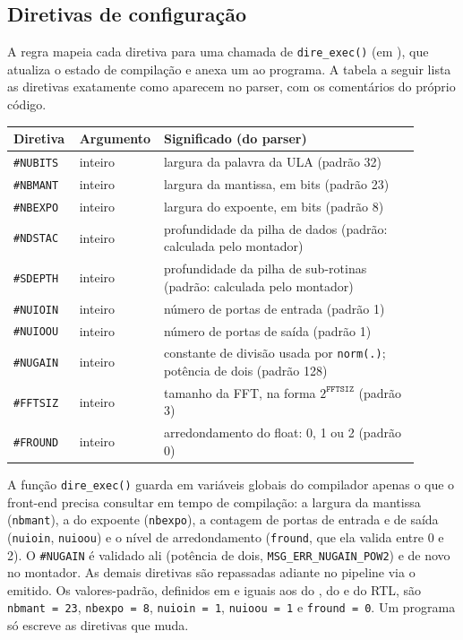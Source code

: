 \subsection{Diretivas de configuração}

A regra  mapeia cada diretiva para uma chamada de
\lstinline|dire_exec()| (em ), que atualiza o estado de
compilação e anexa um  ao programa. A tabela a seguir lista
as diretivas exatamente como aparecem no parser, com os comentários do próprio
código.

\begin{longtable}{@{}p{0.16\linewidth}p{0.12\linewidth}p{0.62\linewidth}@{}}
\toprule
\textbf{Diretiva} & \textbf{Argumento} & \textbf{Significado (do parser)} \\
\midrule
\endhead
\lstinline|#NUBITS| & inteiro & largura da palavra da ULA (padrão 32) \\
\lstinline|#NBMANT| & inteiro & largura da mantissa, em bits (padrão 23) \\
\lstinline|#NBEXPO| & inteiro & largura do expoente, em bits (padrão 8) \\
\lstinline|#NDSTAC| & inteiro & profundidade da pilha de dados (padrão: calculada pelo montador) \\
\lstinline|#SDEPTH| & inteiro & profundidade da pilha de sub-rotinas (padrão: calculada pelo montador) \\
\lstinline|#NUIOIN| & inteiro & número de portas de entrada (padrão 1) \\
\lstinline|#NUIOOU| & inteiro & número de portas de saída (padrão 1) \\
\lstinline|#NUGAIN| & inteiro & constante de divisão usada por \lstinline|norm(.)|; potência de dois (padrão 128) \\
\lstinline|#FFTSIZ| & inteiro & tamanho da FFT, na forma $2^{\texttt{FFTSIZ}}$ (padrão 3) \\
\lstinline|#FROUND| & inteiro & arredondamento do float: 0, 1 ou 2 (padrão 0) \\
\bottomrule
\end{longtable}

A função \lstinline|dire_exec()| guarda em variáveis globais do compilador apenas
o que o front-end \cmm{} precisa consultar em tempo de compilação: a largura da
mantissa (\lstinline|nbmant|), a do expoente (\lstinline|nbexpo|), a contagem de
portas de entrada e de saída (\lstinline|nuioin|, \lstinline|nuioou|) e o nível
de arredondamento (\lstinline|fround|, que ela valida entre 0 e 2). O
\lstinline|#NUGAIN| é validado ali (potência de dois, \lstinline|MSG_ERR_NUGAIN_POW2|)
e de novo no montador. As demais diretivas são repassadas adiante no pipeline via
o  emitido. Os valores-padrão, definidos em
 e iguais aos do , do  e do RTL, são
\lstinline|nbmant = 23|, \lstinline|nbexpo = 8|, \lstinline|nuioin = 1|,
\lstinline|nuioou = 1| e \lstinline|fround = 0|. Um programa só escreve as
diretivas que muda.

